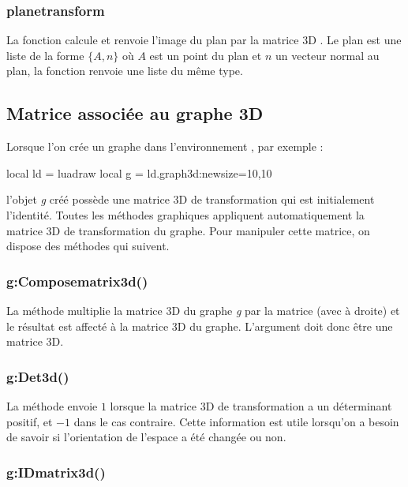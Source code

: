 \subsubsection{planetransform}

La fonction  calcule et renvoie l'image du plan  par la matrice 3D . Le plan  est une liste de la forme $\{A,n\}$ où $A$ est un point du plan et $n$ un vecteur normal au plan, la fonction renvoie une liste du même type.


\subsection{Matrice associée au graphe 3D}

Lorsque l'on crée un graphe dans l'environnement \luadrawenv, par exemple :
\begin{Luacode}
local ld = luadraw
local g = ld.graph3d:new{size={10,10}}
\end{Luacode}

l'objet \emph{g} créé possède une matrice 3D de transformation qui est initialement l'identité. Toutes les méthodes graphiques appliquent automatiquement la matrice 3D de transformation du graphe. Pour manipuler cette matrice, on dispose des méthodes qui suivent.

\subsubsection{g:Composematrix3d()}

La méthode  multiplie la matrice 3D du graphe \emph g par la matrice  (avec  à droite) et le résultat est affecté à la matrice 3D du graphe. L'argument  doit donc être une matrice 3D.

\subsubsection{g:Det3d()}

La méthode  envoie $1$ lorsque la matrice 3D de transformation a un déterminant positif, et $-1$ dans le cas contraire. Cette information est utile lorsqu'on a besoin de savoir si l'orientation de l'espace a été changée ou non.

\subsubsection{g:IDmatrix3d()}

